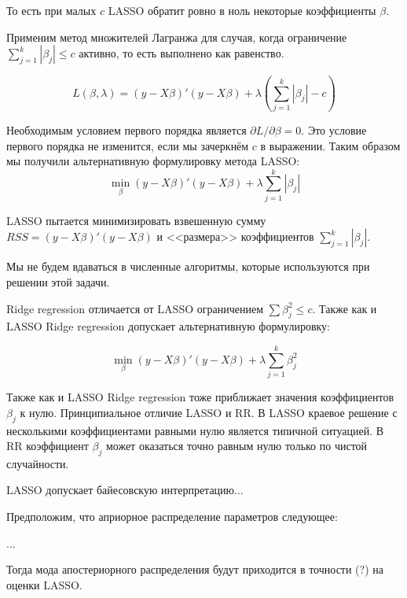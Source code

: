 \documentclass[pdftex,12pt,a4paper]{article}
\begin{document}


То есть при малых $c$ LASSO обратит ровно в ноль некоторые коэффициенты $\beta$.


Применим метод множителей Лагранжа для случая, когда ограничение $\sum_{j=1}^{k}|\beta_j|\leq c$ активно, то есть выполнено как равенство. 

\begin{equation}
L(\beta,\lambda)=(y-X\beta)'(y-X\beta)+\lambda \left(\sum_{j=1}^{k}|\beta_j| - c \right)
\end{equation}

Необходимым условием первого порядка является $\partial L/\partial \beta =0$. 
Это условие первого порядка не изменится, если мы зачеркнём $c$ в выражении. 
Таким образом мы получили альтернативную формулировку метода LASSO:
\begin{equation}
\min_{\beta} (y-X\beta)'(y-X\beta)+\lambda \sum_{j=1}^{k}|\beta_j|
\end{equation}

LASSO пытается минимизировать взвешенную сумму $RSS=(y-X\beta)'(y-X\beta)$ и <<размера>> коэффициентов $\sum_{j=1}^{k}|\beta_j|$.


Мы не будем вдаваться в численные алгоритмы, которые используются при решении этой задачи.


Ridge regression отличается от LASSO ограничением $\sum \beta_j^2\leq c$. 
Также как и LASSO Ridge regression допускает альтернативную формулировку:

\begin{equation}
\min_{\beta} (y-X\beta)'(y-X\beta)+\lambda \sum_{j=1}^{k} \beta_j^2
\end{equation}

Также как и LASSO Ridge regression тоже приближает значения коэффициентов $\beta_j$ к нулю. 
Принципиальное отличие LASSO и RR. 
В LASSO краевое решение с несколькими коэффициентами равными нулю является типичной ситуацией. 
В RR коэффициент $\beta_j$ может оказаться точно равным нулю только по чистой случайности. 


LASSO допускает байесовскую интерпретацию...

Предположим, что априорное распределение параметров следующее:

...


Тогда мода апостериорного распределения будут приходится в точности (?) на оценки LASSO.


\end{document}
